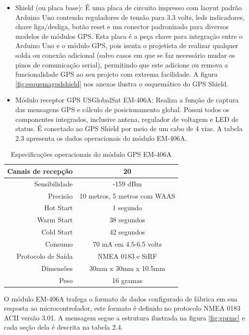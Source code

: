 \begin{itemize}
	\item Shield (ou placa base): É uma placa de circuito impresso com laoyut padrão Arduino Uno contendo reguladores de tensão para 3.3 volts, leds indicadores, chave liga/desliga, botão reset e um conector padronizado para diversos modelos de módulos GPS. Esta placa é a peça chave para integração entre o Arduino Uno e o módulo GPS, pois isenta o projetista de realizar qualquer solda ou conexão adicional (salvo casos em que se faz necessário mudar os pinos de comunicação serial), permitindo que este adicione ou remova a funcionalidade GPS ao seu projeto com extrema facilidade. A figura \ref{fig:esquemagpdshield} nos anexos ilustra o esquemático do GPS Shield.

	\item Módulo receptor GPS USGlobalSat EM-406A: Realiza a função de captura das mensagens GPS e cálculo de posicionamento global. Possui todos os componentes integrados, inclusive antena, regulador de voltagem e LED de status. É conectado ao GPS Shield por meio de um cabo de 4 vias. A tabela 2.3 apresenta os dados operacionais do módulo EM-406A.	
\end{itemize}

\begin{table}[!h]
  \caption{Especificações operacionais do módulo GPS EM-406A}
	\centering
	\begin{tabular}{|r|c|}
		\hline
			Canais de recepção & 20
		\\
		\hline
			Sensibilidade & -159 dBm
		\\
		\hline
			Precisão & 10 metros, 5 metros com WAAS
		\\
		\hline
		  Hot Start & 1 segundo
		\\
		\hline
			Warm Start & 38 segundos
		\\
		\hline
			Cold Start & 42 segundos
		\\
		\hline
			Consumo & 70 mA em 4.5-6.5 volts
		\\
		\hline
			Protocolo de Saída & NMEA 0183 e SiRF
		\\
		\hline
			Dimensões & 30mm x 30mm x 10.5mm
		\\
		\hline
		  Peso & 16 gramas
		\\
\hline
\end{tabular}
\end{table}

\newpage
O módulo EM-406A trafega o formato de dados configurado de fábrica em sua resposta ao microcontrolador, este formato é definido no protocolo NMEA 0183 ACII versão 3.01. A mensagem segue a estrutura ilustrada na figura \ref{fig:gprmc} e cada seção dela é descrita na tabela 2.4.

